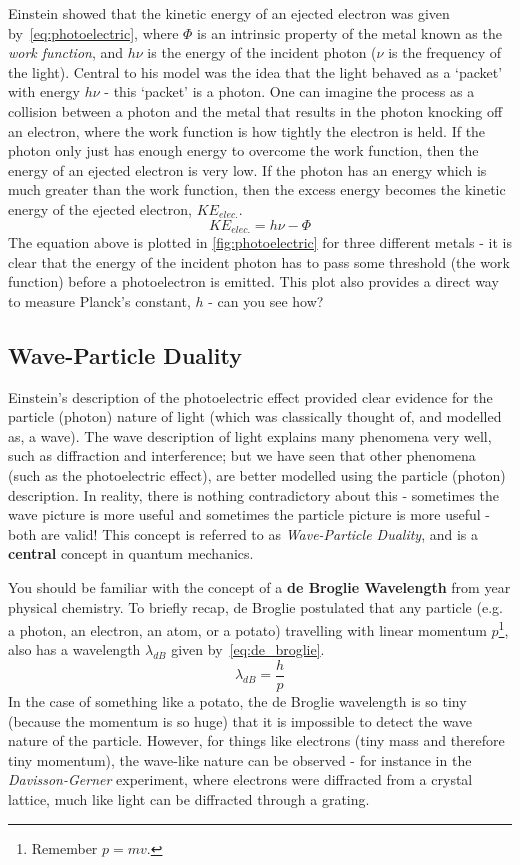 \documentclass{memoir}[11pt,oneside,a4paper,openany]
\begin{document}
Einstein showed that the kinetic energy of an ejected electron was given by~\autoref{eq:photoelectric}, where $\Phi$ is an intrinsic property of the metal known as the \emph{work function}, and $h\nu$ is the energy of the incident photon ($\nu$ is the frequency of the light). Central to his model was the idea that the light behaved as a `packet' with energy $h\nu$ - this `packet' is a photon. One can imagine the process as a collision between a photon and the metal that results in the photon knocking off an electron, where the work function is how tightly the electron is held. If the photon only just has enough energy to overcome the work function, then the energy of an ejected electron is very low. If the photon has an energy which is much greater than the work function, then the excess energy becomes the kinetic energy of the ejected electron, $KE_{elec.}$. 
\begin{equation}\label{eq:photoelectric}
	KE_{elec.} = h\nu - \Phi
\end{equation}
The equation above is plotted in \autoref{fig:photoelectric} for three different metals - it is clear that the energy of the incident photon has to pass some threshold (the work function) before a photoelectron is emitted. This plot also provides a direct way to measure Planck's constant, $h$ - can you see how?

\subsection{Wave-Particle Duality}
Einstein's description of the photoelectric effect provided clear evidence for the particle (photon) nature of light (which was classically thought of, and modelled as, a wave). The wave description of light explains many phenomena very well, such as diffraction and interference; but we have seen that other phenomena (such as the photoelectric effect), are better modelled using the particle (photon) description. In reality, there is nothing contradictory about this - sometimes the wave picture is more useful and sometimes the particle picture is more useful - both are valid! This concept is referred to as \emph{Wave-Particle Duality}, and is a \textbf{central} concept in quantum mechanics.

You should be familiar with the concept of a \textbf{de Broglie Wavelength} from  year physical chemistry. To briefly recap, de Broglie postulated that any particle (e.g. a photon, an electron, an atom, or a potato) travelling with linear momentum $p$\footnote{Remember $p = mv$.}, also has a wavelength $\lambda_{dB}$ given by~\autoref{eq:de_broglie}.
\begin{equation}\label{eq:de_broglie}
	\lambda_{dB} = \frac{h}{p}
\end{equation}
In the case of something like a potato, the de Broglie wavelength is so tiny (because the momentum is so huge) that it is impossible to detect the wave nature of the particle. However, for things like electrons (tiny mass and therefore tiny momentum), the wave-like nature can be observed - for instance in the \emph{Davisson-Gerner} experiment, where electrons were diffracted from a crystal lattice, much like light can be diffracted through a grating.
\end{document}
